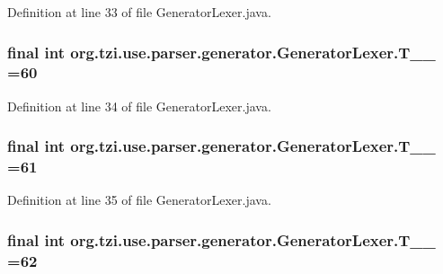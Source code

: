 Definition at line 33 of file Generator\-Lexer.\-java.

\hypertarget{classorg_1_1tzi_1_1use_1_1parser_1_1generator_1_1_generator_lexer_aba4e91fbeb994fb497e157e990a771a8}{
\subsubsection[{T\-\_\-\-\_\-60}]{\setlength{\rightskip}{0pt plus 5cm}final int org.\-tzi.\-use.\-parser.\-generator.\-Generator\-Lexer.\-T\-\_\-\-\_ =60\hspace{0.3cm}{\ttfamily [static]}}}\label{classorg_1_1tzi_1_1use_1_1parser_1_1generator_1_1_generator_lexer_aba4e91fbeb994fb497e157e990a771a8}


Definition at line 34 of file Generator\-Lexer.\-java.

\hypertarget{classorg_1_1tzi_1_1use_1_1parser_1_1generator_1_1_generator_lexer_a4de075aa61cdaf7977672e1942df8e41}{
\subsubsection[{T\-\_\-\-\_\-61}]{\setlength{\rightskip}{0pt plus 5cm}final int org.\-tzi.\-use.\-parser.\-generator.\-Generator\-Lexer.\-T\-\_\-\-\_ =61\hspace{0.3cm}{\ttfamily [static]}}}\label{classorg_1_1tzi_1_1use_1_1parser_1_1generator_1_1_generator_lexer_a4de075aa61cdaf7977672e1942df8e41}


Definition at line 35 of file Generator\-Lexer.\-java.

\hypertarget{classorg_1_1tzi_1_1use_1_1parser_1_1generator_1_1_generator_lexer_a1fea0657e6fa59dc602e9add5a46a80a}{
\subsubsection[{T\-\_\-\-\_\-62}]{\setlength{\rightskip}{0pt plus 5cm}final int org.\-tzi.\-use.\-parser.\-generator.\-Generator\-Lexer.\-T\-\_\-\-\_ =62\hspace{0.3cm}{\ttfamily [static]}}}\label{classorg_1_1tzi_1_1use_1_1parser_1_1generator_1_1_generator_lexer_a1fea0657e6fa59dc602e9add5a46a80a}



